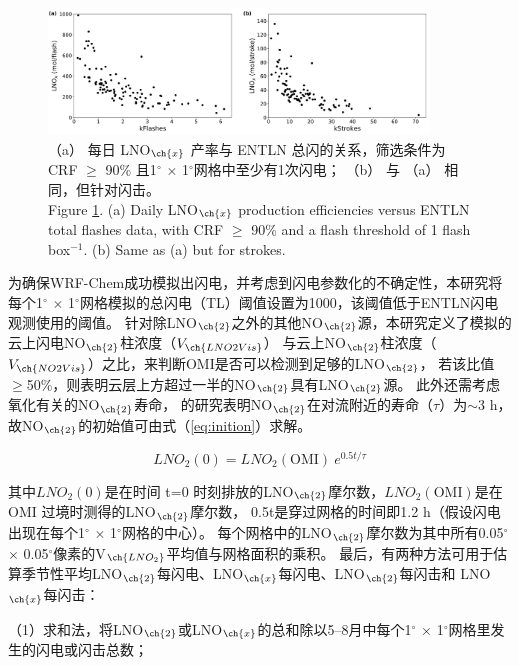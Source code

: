 \begin{figure}[H]
\centering
\includegraphics[width=0.9\textwidth]{./figures/us_flash_threshold.png}
\caption{
（a） 每日 LNO$_{\ch{x}}$ 产率与 ENTLN 总闪的关系，筛选条件为CRF $\geq$ 90\% 且1$^{\circ}$ $\times$ 1$^{\circ}$网格中至少有1次闪电；
 （b） 与 （a） 相同，但针对闪击。\\
Figure \ref{fig:us_flash_threshold}. (a) Daily LNO$_{\ch{x}}$ production efficiencies versus ENTLN total flashes data, with CRF $\geq$ 90\% and a flash threshold of 1 flash box$^{-1}$.
(b) Same as (a) but for strokes.}
\label{fig:us_flash_threshold}
\end{figure}


为确保WRF-Chem成功模拟出闪电，并考虑到闪电参数化的不确定性，本研究将每个1$^{\circ}$ $\times$ 1$^{\circ}$网格模拟的总闪电（TL）阈值设置为1000，该阈值低于ENTLN闪电观测使用的阈值。
针对除LNO$_{\ch{2}}$之外的其他NO$_{\ch{2}}$源，本研究定义了模拟的云上闪电NO$_{\ch{2}}$柱浓度（$V_{\ch{LNO2Vis}}$）
与云上NO$_{\ch{2}}$柱浓度（$V_{\ch{NO2Vis}}$）之比，来判断OMI是否可以检测到足够的LNO$_{\ch{2}}$，
若该比值$\geq$50\%，则表明云层上方超过一半的NO$_{\ch{2}}$具有LNO$_{\ch{2}}$源。
此外还需考虑氧化有关的NO$_{\ch{2}}$寿命，
\citet{Nault.2017}的研究表明NO$_{\ch{2}}$在对流附近的寿命（$\tau$）为$\sim$3 h，故NO$_{\ch{2}}$的初始值可由式（\ref{eq:inition}）求解。

\begin{equation} \label{eq:inition}
LNO_2(0) = LNO_2(\mathrm{OMI})\ e^{0.5t/\tau}
\end{equation}

其中$LNO_2(0)$是在时间 t=0 时刻排放的LNO$_{\ch{2}}$摩尔数，$LNO_2(\mathrm{OMI})$是在 OMI 过境时测得的LNO$_{\ch{2}}$摩尔数，
0.5t是穿过网格的时间即1.2 h（假设闪电出现在每个1$^{\circ}$ $\times$ 1$^{\circ}$网格的中心）。
每个网格中的LNO$_{\ch{2}}$摩尔数为其中所有0.05$^{\circ}$ $\times$ 0.05$^{\circ}$像素的V$_{\ch{LNO_2}}$平均值与网格面积的乘积。
最后，有两种方法可用于估算季节性平均LNO$_{\ch{2}}$每闪电、LNO$_{\ch{x}}$每闪电、LNO$_{\ch{2}}$每闪击和 LNO$_{\ch{x}}$每闪击：

（1）求和法，将LNO$_{\ch{2}}$或LNO$_{\ch{x}}$的总和除以5--8月中每个1$^{\circ}$ $\times$ 1$^{\circ}$网格里发生的闪电或闪击总数；

